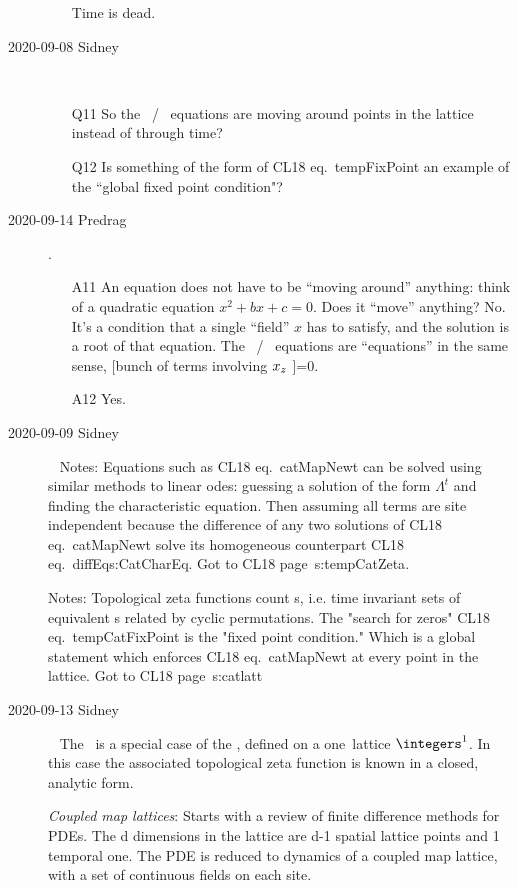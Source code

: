 \begin{description}
\begin{itemize}
Time is dead.
\end{itemize}

\item[2020-09-08 Sidney]~~
\begin{itemize}
	\item[Q11]
So the \templatt\ / \catlatt\ equations are moving around points in the lattice instead of
through time?
	\item[Q12]
Is something of the form of CL18 eq.~{tempFixPoint} an example
of the ``global fixed point condition"?
\end{itemize}

\item[2020-09-14 Predrag].
\begin{itemize}
	\item[A11]
An equation does not have to be ``moving around'' anything: think of a
quadratic equation $x^2+bx+c=0$. Does it ``move'' anything? No. It's a condition
that a single ``field'' $x$ has to satisfy, and the solution is a root of that
equation.
The \templatt\ / \catlatt\ equations are ``equations'' in the same sense,
[bunch of terms involving $x_z$ ]=0.
	\item[A12]
Yes.
\end{itemize}

\item[2020-09-09 Sidney]~
Notes: Equations such as CL18 eq.~{catMapNewt} can be solved using similar methods to linear odes: guessing a solution of the form $\Lambda^t$ and finding the characteristic equation. Then assuming all terms are site independent because the difference of any two solutions of CL18 eq.~{catMapNewt} solve its homogeneous counterpart CL18 eq.~{diffEqs:CatCharEq}. Got to CL18 page~{s:tempCatZeta}.

Notes: Topological zeta functions count {\orbit}s, i.e. time invariant sets of equivalent {\lattstate}s related by cyclic permutations. The "search for zeros" CL18 eq.~{tempCatFixPoint} is the "fixed point condition." Which is a global statement which enforces CL18 eq.~{catMapNewt} at every point in the lattice. Got to CL18 page~{s:catlatt}

\item[2020-09-13 Sidney]~
The \templatt\ is a special case of the \catlatt, defined on a one\dmn\
lattice $\integers^1$. In this case the associated topological zeta
function is known in a closed, analytic form.

\emph{Coupled map lattices}: Starts with a review of finite difference
methods for PDEs. The d dimensions in the lattice are d-1 spatial lattice
points and 1 temporal one. The PDE is reduced to dynamics of a coupled
map lattice, with a set of continuous fields on each site.


\end{description}
